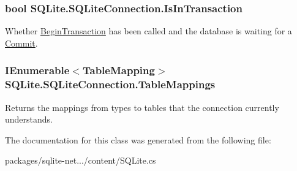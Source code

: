 \subsubsection[{Is\+In\+Transaction}]{\setlength{\rightskip}{0pt plus 5cm}bool S\+Q\+Lite.\+S\+Q\+Lite\+Connection.\+Is\+In\+Transaction\hspace{0.3cm}{\ttfamily [get]}}\label{classSQLite_1_1SQLiteConnection_a9450dfedb603c08eb75f57f36db41d9b}


Whether \hyperlink{classSQLite_1_1SQLiteConnection_aba3becdb524808bd49f349587f1b7049}{Begin\+Transaction} has been called and the database is waiting for a \hyperlink{classSQLite_1_1SQLiteConnection_a2c8187a19b5065f6b23c079e7cca29fe}{Commit}. 

\hypertarget{classSQLite_1_1SQLiteConnection_ac0c3b1e8f8060ef9777fac08751d159e}{}
\subsubsection[{Table\+Mappings}]{\setlength{\rightskip}{0pt plus 5cm}I\+Enumerable$<${\bf Table\+Mapping}$>$ S\+Q\+Lite.\+S\+Q\+Lite\+Connection.\+Table\+Mappings\hspace{0.3cm}{\ttfamily [get]}}\label{classSQLite_1_1SQLiteConnection_ac0c3b1e8f8060ef9777fac08751d159e}


Returns the mappings from types to tables that the connection currently understands. 



The documentation for this class was generated from the following file\+:\begin{DoxyCompactItemize}
\item 
packages/sqlite-\/net.../content/S\+Q\+Lite.\+cs\end{DoxyCompactItemize}
